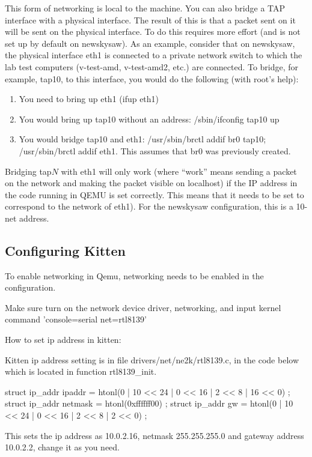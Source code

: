 \documentclass[11pt]{article}
\begin{document}
This form of networking is local to the machine.  You can also bridge
a TAP interface with a physical interface.  The result of this is that
a packet sent on it will be sent on the physical interface.  To do
this requires more effort (and is not set up by default on newskysaw).
As an example, consider that on newskysaw, the physical interface eth1
is connected to a private network switch to which the lab test
computers (v-test-amd, v-test-amd2, etc.) are connected.  To bridge,
for example, tap10, to this interface, you would do the following
(with root's help):
\begin{enumerate}
\item You need to bring up eth1 (ifup eth1)
\item You would bring up tap10 without an address:  /sbin/ifconfig
tap10 up
\item You would bridge tap10 and eth1:  /usr/sbin/brctl addif br0
tap10; /usr/sbin/brctl addif eth1.  This assumes that br0 was
previously created. 
\end{enumerate}

Bridging tap$N$ with eth1 will only work (where ``work'' means sending
a packet on the network and making the packet visible on localhost) if
the IP address in the code running in QEMU is set correctly.  This
means that it needs to be set to correspond to the network of eth1).  
For the newskysaw configuration, this is a 10-net address.


\subsection{Configuring Kitten}

To enable networking in Qemu, networking needs to be enabled in the
configuration.

Make sure turn on the network device driver, networking, and input
kernel command 'console=serial net=rtl8139'

How to set ip address in kitten:

Kitten ip address setting is in file drivers/net/ne2k/rtl8139.c, in
the code below which is located in function rtl8139\_init.

  struct ip\_addr ipaddr = { htonl(0 | 10 << 24 | 0 << 16 | 2 << 8 | 16 << 0) }; 
  struct ip\_addr netmask = { htonl(0xffffff00) }; 
  struct ip\_addr gw = { htonl(0 | 10 << 24 | 0 << 16 | 2 << 8 | 2 << 0) };

This sets the ip address as 10.0.2.16, netmask 255.255.255.0 and gateway address 10.0.2.2, change it as you need.
\end{document}
